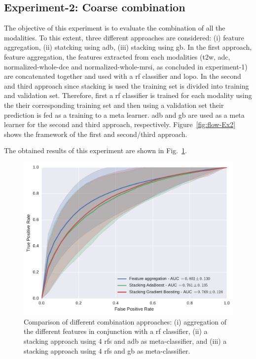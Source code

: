 \subsection{Experiment-2: Coarse combination} \label{subsec:chp6:exp-res:Ex2}
The objective of this experiment is to evaluate the combination of all the modalities.
To this extent, three different approaches are considered: (i) feature aggregation, (ii) statcking using \ac{adb}, (iii) stacking using \ac{gb}. 
In the first approach, feature aggregation, the features extracted from each modalities (\ac{t2w}, \ac{adc}, normalized-whole-\ac{dce} and normalized-whole-\ac{mrsi}, as concluded in experiment-1) are concatenated together and used with a \ac{rf} classifier and \ac{lopo}. 
In the second and third approach since stacking is used the training set is divided into training and validation set.
Therefore, first a \ac{rf} classifier is trained for each modality using the their corresponding training set and then using a validation set their prediction is fed as a training to a meta learner.
\Ac{adb} and \ac{gb} are used as a meta learner for the second and third approach, respectively. 
Figure~\ref{fig:flow-Ex2} shows the framework of the first and second/third approach. 

The obtained results of this experiment are shown in Fig.~\ref{fig:res-Exp2}.
\begin{figure}
  \centering
  \includegraphics[width=0.8\linewidth]{6_pipeline/figures/exp-2/comb_all.pdf}
  \caption[Comparison of different combination approaches.]{Comparison of different combination approaches: (i) aggregation of the different features in conjunction with a \acs*{rf} classifier, (ii) a stacking approach using 4 \acs*{rf}s and \acs*{adb} as meta-classifier, and (iii) a stacking approach using 4 \acs*{rf}s and \acs*{gb} as meta-classifier.}
  \label{fig:res-Exp2}
\end{figure}

